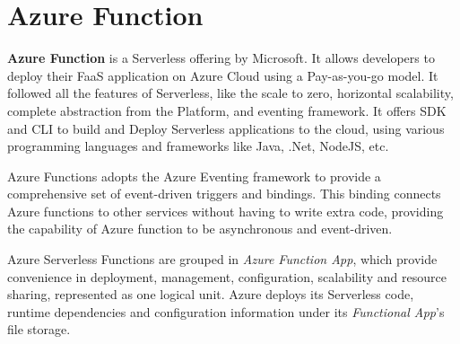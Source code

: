 \documentclass{article}
\begin{document}
\section{Azure Function}
\begin{flushleft}
\textbf{Azure Function} is a Serverless offering by Microsoft. It allows developers to deploy their FaaS application on Azure Cloud using a Pay-as-you-go model. It followed all the features of Serverless, like the scale to zero, horizontal scalability, complete abstraction from the Platform, and eventing framework. It offers SDK and CLI to build and Deploy Serverless applications to the cloud, using various programming languages and frameworks like Java, .Net, NodeJS, etc.

Azure Functions adopts the Azure Eventing framework to provide a comprehensive set of event-driven triggers and bindings. This binding connects Azure functions to other services without having to write extra code, providing the capability of Azure function to be asynchronous and event-driven.

Azure Serverless Functions are grouped in \textit{Azure Function App}, which provide convenience in deployment, management, configuration, scalability and resource sharing, represented as one logical unit. 
Azure deploys its Serverless code, runtime dependencies and configuration information under its \textit{Functional App}'s file storage. 
\end{flushleft}
\pagebreak
\end{document}
